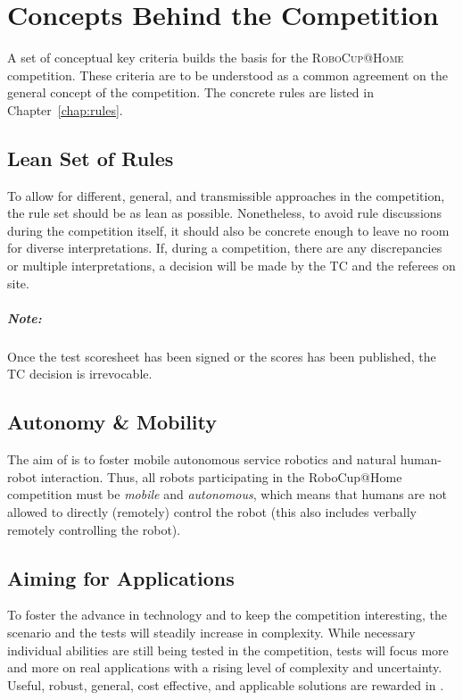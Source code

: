 \chapter{Concepts Behind the Competition}
\label{chap:concepts}

A set of conceptual key criteria builds the basis for the \textsc{RoboCup@Home} competition.
These criteria are to be understood as a common agreement on the general concept of the competition.
The concrete rules are listed in Chapter~\ref{chap:rules}.

\section{Lean Set of Rules}
\label{concept:lean_set_of_rules}

To allow for different, general, and transmissible approaches in the \AtHome{} competition, the rule set should be as lean as possible.
Nonetheless, to avoid rule discussions during the competition itself, it should also be concrete enough to leave no room for diverse interpretations.
If, during a competition, there are any discrepancies or multiple interpretations, a decision will be made by the TC and the referees on site.

\paragraph*{Note:} Once the test scoresheet has been signed or the scores has been published, the TC decision is irrevocable.

\section{Autonomy \& Mobility}
\label{concept:autonomy_and_mobility}

The aim of \AtHome{} is to foster mobile autonomous service robotics and natural human-robot interaction.
Thus, all robots participating in the RoboCup@Home competition must be \emph{mobile} and \emph{autonomous}, which means that humans are not allowed to directly (remotely) control the robot (this also includes verbally remotely controlling the robot).

\section{Aiming for Applications}
\label{concept:aiming_for_applications}

To foster the advance in technology and to keep the competition interesting, the scenario and the tests will steadily increase in complexity.
While necessary individual abilities are still being tested in the competition, tests will focus more and more on real applications with a rising level of complexity and uncertainty.
Useful, robust, general, cost effective, and applicable solutions are rewarded in \AtHome.

